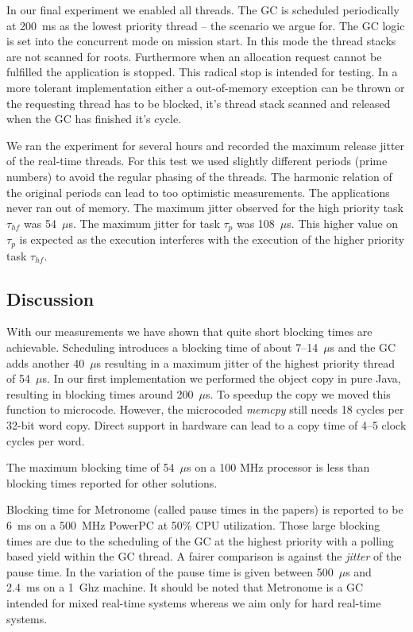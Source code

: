 In our final experiment we enabled all threads. The GC is scheduled
periodically at 200~ms as the lowest priority thread -- the scenario
we argue for. The GC logic is set into the concurrent mode on
mission start. In this mode the thread stacks are not scanned for
roots. Furthermore when an allocation request cannot be fulfilled
the application is stopped. This radical stop is intended for
testing. In a more tolerant implementation either a out-of-memory
exception can be thrown or the requesting thread has to be blocked,
it's thread stack scanned and released when the GC has finished it's
cycle.

We ran the experiment for several hours and recorded the maximum
release jitter of the real-time threads. For this test we used
slightly different periods (prime numbers) to avoid the regular
phasing of the threads. The harmonic relation of the original
periods can lead to too optimistic measurements. The applications
never ran out of memory. The maximum jitter observed for the high
priority task $\tau_{hf}$ was 54~$\mu$s. The maximum jitter for task
$\tau_{p}$ was 108~$\mu$s. This higher value on $\tau_{p}$ is
expected as the execution interferes with the execution of the
higher priority task $\tau_{hf}$.

\subsection{Discussion}


With our measurements we have shown that quite short blocking times
are achievable. Scheduling introduces a blocking time of about
7--14~$\mu$s and the GC adds another 40~$\mu$s resulting in a
maximum jitter of the highest priority thread of 54~$\mu$s. In our
first implementation we performed the object copy in pure Java,
resulting in blocking times around 200~$\mu$s. To speedup the copy
we moved this function to microcode. However, the microcoded
\emph{memcpy} still needs 18 cycles per 32-bit word copy. Direct
support in hardware can lead to a copy time of 4--5 clock cycles per
word.

The maximum blocking time of 54~$\mu$s on a 100 MHz processor is less than
blocking times reported for other solutions.

Blocking time for Metronome (called pause times in the papers) is
reported to be 6~ms \cite{gc:jtres:metronome} on a 500~MHz PowerPC
at 50\% CPU utilization. Those large blocking times are due to the
scheduling of the GC at the highest priority with a polling based
yield within the GC thread. A fairer comparison is against the
\emph{jitter} of the pause time. In \cite{gc:bacon05} the variation
of the pause time is given between 500~$\mu$s and 2.4~ms on a 1~Ghz
machine. It should be noted that Metronome is a GC intended for
mixed real-time systems whereas we aim only for hard real-time
systems.

